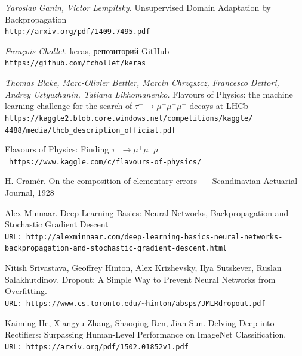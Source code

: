 \documentclass[14pt, a4paper]{extarticle}
\begin{document}
\begin{thebibliography}{3}  

\textit{Yaroslav Ganin, Victor Lempitsky.} Unsupervised Domain Adaptation by Backpropagation \\ \verb|http://arxiv.org/pdf/1409.7495.pdf|

\textit{François Chollet.} keras, репозиторий GitHub \\ \verb|https://github.com/fchollet/keras|

\textit{Thomas Blake, Marc-Olivier Bettler, Marcin Chrząszcz, Francesco Dettori, Andrey Ustyuzhanin, Tatiana Likhomanenko.} Flavours of Physics: the machine learning challenge for the search of $\tau^-\rightarrow\mu^+ \mu^- \mu^-$ decays at LHCb \\ 
	\verb|https://kaggle2.blob.core.windows.net/competitions/kaggle/|\\ \verb|4488/media/lhcb_description_official.pdf|
	
	
 Flavours of Physics: Finding $\tau^-\rightarrow\mu^+ \mu^- \mu^-$ \\ \verb|https://www.kaggle.com/c/flavours-of-physics/|

H. Cram\'er. On the composition of elementary errors — Scandinavian Actuarial Journal, 1928 %

Alex Minnaar. Deep Learning Basics: Neural Networks, Backpropagation and Stochastic Gradient Descent \\
\verb|URL: http://alexminnaar.com/deep-learning-basics-neural-networks-backpropagation-and-stochastic-gradient-descent.html|

Nitish Srivastava, Geoffrey Hinton, Alex Krizhevsky, Ilya Sutskever, Ruslan Salakhutdinov. Dropout: A Simple Way to Prevent Neural Networks from
Overfitting. \\ \verb|URL: https://www.cs.toronto.edu/~hinton/absps/JMLRdropout.pdf|

Kaiming He, Xiangyu Zhang, Shaoqing Ren, Jian Sun. Delving Deep into Rectifiers:
Surpassing Human-Level Performance on ImageNet Classification. \\\verb|URL: https://arxiv.org/pdf/1502.01852v1.pdf|

\end{thebibliography}

\label{page:last}
\end{document}
